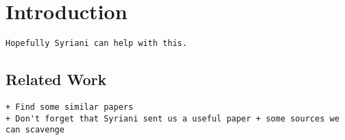 \section{Introduction}
\label{sec:introduction}

\begin{verbatim}
Hopefully Syriani can help with this.
\end{verbatim}





\subsection{Related Work}
\label{subsec:related_work}

\begin{verbatim}
+ Find some similar papers
+ Don't forget that Syriani sent us a useful paper + some sources we can scavenge
\end{verbatim}
